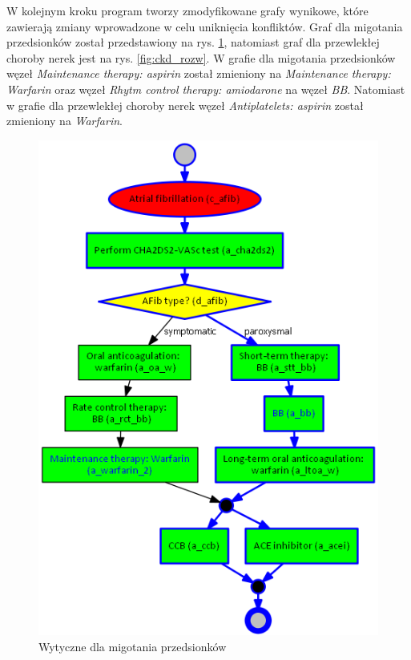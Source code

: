 W kolejnym kroku program tworzy zmodyfikowane grafy wynikowe, które zawierają zmiany wprowadzone w celu uniknięcia konfliktów. Graf dla migotania przedsionków został przedstawiony na rys. \ref{fig:afib_rozw}, natomiast graf dla przewlekłej choroby nerek jest na rys. \ref{fig:ckd_rozw}. W grafie dla migotania przedsionków węzeł \textit{Maintenance therapy: aspirin} został zmieniony na \textit{Maintenance therapy: Warfarin} oraz węzeł \textit{Rhytm control therapy: amiodarone} na węzeł \textit{BB}. Natomiast w grafie dla przewlekłej choroby nerek węzeł \textit{Antiplatelets: aspirin} został zmieniony na \textit{Warfarin}.

\begin{figure}[H]
\centering
\includegraphics[scale=0.5]{img/rozwiazanie1afib-ver-4_przyklad.png}
\caption{Wytyczne dla migotania przedsionków}
\label{fig:afib_rozw}
\end{figure}
